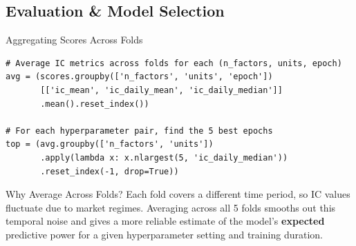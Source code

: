 \documentclass[aspectratio=169, 11pt]{beamer}
\begin{document}
\subsection{Evaluation \& Model Selection}
%
\begin{frame}[fragile]{Aggregating Scores Across Folds}

\begin{lstlisting}
# Average IC metrics across folds for each (n_factors, units, epoch)
avg = (scores.groupby(['n_factors', 'units', 'epoch'])
       [['ic_mean', 'ic_daily_mean', 'ic_daily_median']]
       .mean().reset_index())

# For each hyperparameter pair, find the 5 best epochs
top = (avg.groupby(['n_factors', 'units'])
       .apply(lambda x: x.nlargest(5, 'ic_daily_median'))
       .reset_index(-1, drop=True))
\end{lstlisting}

\vspace{0.3cm}

\begin{block}{Why Average Across Folds?}
Each fold covers a different time period, so IC values fluctuate due to market regimes. Averaging across all 5 folds smooths out this temporal noise and gives a more reliable estimate of the model's \textbf{expected} predictive power for a given hyperparameter setting and training duration.
\end{block}

\end{frame}
%
%
\end{document}
